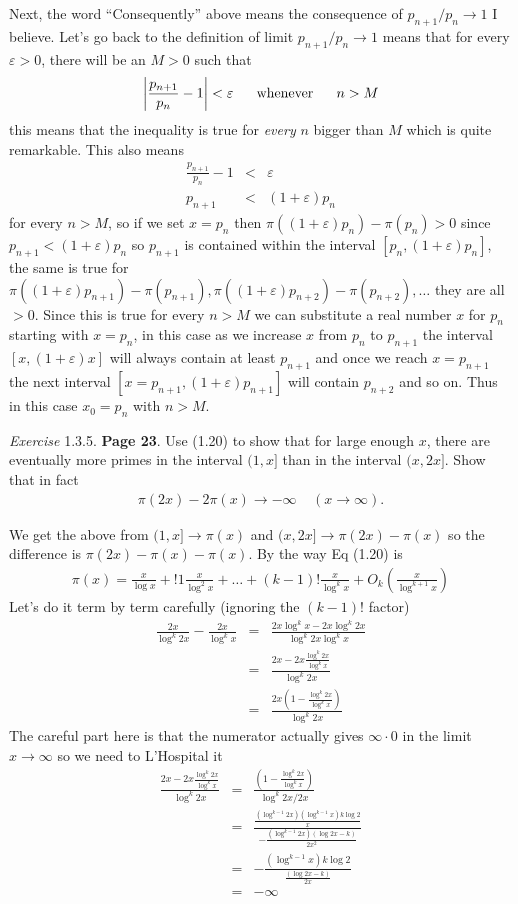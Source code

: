 \documentclass[aps,preprint,preprintnumbers,nofootinbib,showpacs,prd]{revtex4-1}
\newcommand{\nbea}{\begin{eqnarray*}}
\newcommand{\neea}{\end{eqnarray*}}
\begin{document}
Next, the word ``Consequently'' above means the consequence of $p_{n+1}/p_n \to 1$ I believe. Let's go back to the definition of limit $p_{n+1}/p_n \to 1$ means that for every $\varepsilon > 0$, there will be an $M > 0$ such that
%
\nbea
\left|\frac{p_{n+1}}{p_n} - 1\right| < \varepsilon ~~~~~ {\rm whenever} ~~~~~ n > M
\neea
%
this means that the inequality is true for {\it every} $n$ bigger than $M$ which is quite remarkable. This also means
%
\nbea
\frac{p_{n+1}}{p_n} - 1 & < & \varepsilon \\
p_{n+1} & < & (1 + \varepsilon)p_n
\neea
%
for every $n > M$, so if we set $x = p_n$ then $\pi((1+\varepsilon)p_n) - \pi(p_n) > 0$ since $p_{n+1} < (1 + \varepsilon)p_n$ so $p_{n+1}$ is contained within the interval $[p_n,(1+\varepsilon)p_n]$, the same is true for $\pi((1+\varepsilon)p_{n+1}) - \pi(p_{n+1}), \pi((1+\varepsilon)p_{n+2}) - \pi(p_{n+2}), \dots$ they are all $> 0$. Since this is true for every $n > M$ we can substitute a real number $x$ for $p_n$ starting with $x = p_n$, in this case as we increase $x$ from $p_n$ to $p_{n+1}$ the interval $[x,(1+\varepsilon)x]$ will always contain at least $p_{n+1}$ and once we reach $x=p_{n+1}$ the next interval $[x=p_{n+1}, (1+\varepsilon)p_{n+1}]$ will contain $p_{n+2}$ and so on. Thus in this case $x_0 = p_n$ with $n > M$.

{\it Exercise} 1.3.5. {\bf Page 23}. Use (1.20) to show that for large enough $x$, there are eventually more primes in the interval $(1, x]$ than in the interval $(x, 2x]$. Show that in fact
%
\nbea
\pi(2x) - 2\pi(x) \to -\infty ~~~~~ (x \to \infty ).
\neea
%

We get the above from $(1,x] \to \pi(x)$ and $(x,2x] \to \pi(2x) - \pi(x)$ so the difference is $\pi(2x) - \pi(x) - \pi(x)$. By the way Eq (1.20) is
%
\nbea
\pi(x) = \frac{x}{\log x} + !1\frac{x}{\log^2 x} + \dots + (k-1)!\frac{x}{\log^k x} + O_k \left (\frac{x}{\log^{k+1} x} \right )
\neea
%
Let's do it term by term carefully (ignoring the $(k-1)!$ factor)
%
\nbea
\frac{2x}{\log^k 2x} - \frac{2x}{\log^k x} & = & \frac{2x \log^k x - 2x\log^k 2x}{\log^k 2x \log^k x} \\
& = & \frac{2x - 2x\frac{\log^k 2x}{\log^k x}}{\log^k 2x} \\
& = & \frac{2x \left(1 - \frac{\log^k 2x}{\log^k x}\right)}{\log^k 2x}
\neea
%
The careful part here is that the numerator actually gives $\infty\cdot0$ in the limit $x\to\infty$ so we need to L'Hospital it
%
\nbea
\frac{2x - 2x\frac{\log^k 2x}{\log^k x}}{\log^k 2x} & = & \frac{\left(1 - \frac{\log^k 2x}{\log^k x} \right )}{\log^k 2x/2x} \\
& = & \frac{\frac{(\log^{k-1} 2x) (\log^{k-1} x) k \log 2}{x}}{-\frac{(\log^{k-1} 2x)(\log 2x - k)}{2x^2}} \\
& = & -\frac{ (\log^{k-1} x) k \log 2}{\frac{(\log 2x - k)}{2x}} \\
& = & -\infty
\neea
%
\end{document}
